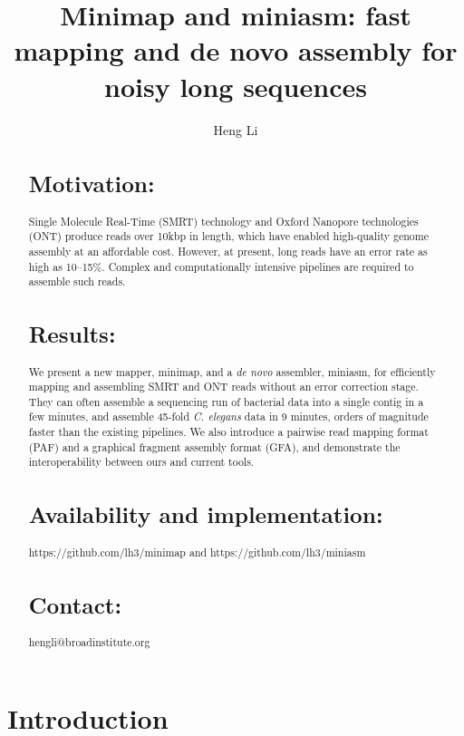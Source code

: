 \documentclass{bioinfo}
\begin{document}

\title[Long-read mapping and assembly]{Minimap and miniasm: fast mapping and de novo assembly for noisy long sequences}
\author[Li]{Heng Li}
\address{Broad Institute, 75 Ames Street, Cambridge, MA 02142, USA}
\maketitle

\begin{abstract}

\section{Motivation:} Single Molecule Real-Time (SMRT) technology and Oxford
Nanopore technologies (ONT) produce reads over 10kbp in length, which have
enabled high-quality genome assembly at an affordable cost.  However, at
present, long reads have an error rate as high as 10--15\%.  Complex and
computationally intensive pipelines are required to assemble such reads.

\section{Results:} We present a new mapper, minimap, and a \emph{de novo}
assembler, miniasm, for efficiently mapping and assembling SMRT and ONT reads
without an error correction stage. They can often assemble a sequencing run of
bacterial data into a single contig in a few minutes, and assemble 45-fold
\emph{C. elegans} data in 9 minutes, orders of magnitude faster than the
existing pipelines. We also introduce a pairwise read mapping format (PAF) and
a graphical fragment assembly format (GFA), and demonstrate the
interoperability between ours and current tools.

\section{Availability and implementation:} https://github.com/lh3/minimap and
https://github.com/lh3/miniasm

\section{Contact:} hengli@broadinstitute.org

\end{abstract}

\section{Introduction}
\end{document}
